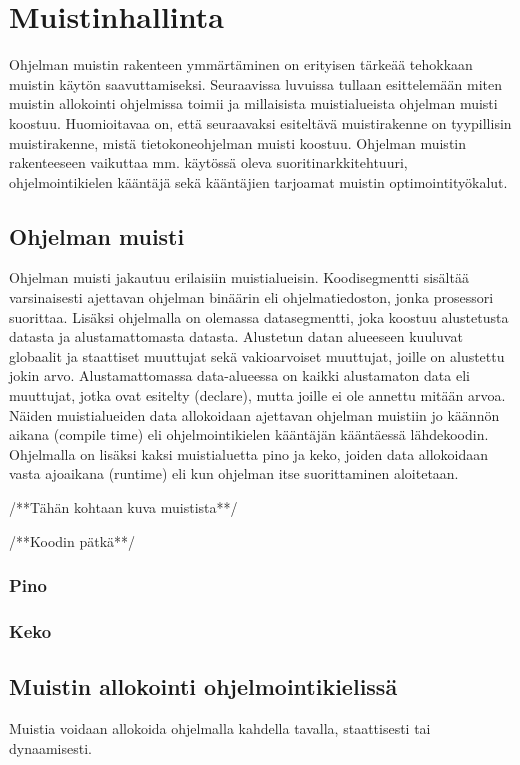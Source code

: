\chapter{Muistinhallinta} \label{Toinen luku}

Ohjelman muistin rakenteen ymmärtäminen on erityisen tärkeää tehokkaan muistin käytön saavuttamiseksi. Seuraavissa luvuissa tullaan esittelemään miten muistin allokointi ohjelmissa toimii
ja millaisista muistialueista ohjelman muisti koostuu. Huomioitavaa on, että seuraavaksi esiteltävä muistirakenne on tyypillisin muistirakenne, mistä tietokoneohjelman muisti koostuu. Ohjelman muistin rakenteeseen vaikuttaa mm. käytössä oleva suoritinarkkitehtuuri, ohjelmointikielen kääntäjä sekä kääntäjien tarjoamat muistin optimointityökalut.

\section{Ohjelman muisti}

Ohjelman muisti jakautuu erilaisiin muistialueisin. Koodisegmentti sisältää varsinaisesti ajettavan ohjelman binäärin eli ohjelmatiedoston, jonka prosessori suorittaa. Lisäksi ohjelmalla on olemassa datasegmentti, joka koostuu alustetusta datasta ja alustamattomasta datasta. Alustetun datan alueeseen kuuluvat globaalit ja staattiset muuttujat sekä vakioarvoiset muuttujat, joille on alustettu jokin arvo. Alustamattomassa data-alueessa on kaikki alustamaton data eli muuttujat, jotka ovat esitelty (declare), mutta joille ei ole annettu mitään arvoa.\cite{mmic2010} Näiden muistialueiden data allokoidaan ajettavan ohjelman muistiin jo käännön aikana (compile time) eli ohjelmointikielen kääntäjän kääntäessä lähdekoodin. Ohjelmalla on lisäksi kaksi muistialuetta pino ja keko, joiden data allokoidaan vasta ajoaikana (runtime) eli kun ohjelman itse suorittaminen aloitetaan.

/**Tähän kohtaan kuva muistista**/

/**Koodin pätkä**/

\subsection{Pino}
\subsection{Keko}

\section{Muistin allokointi ohjelmointikielissä}

Muistia voidaan allokoida ohjelmalla kahdella tavalla, staattisesti tai dynaamisesti.